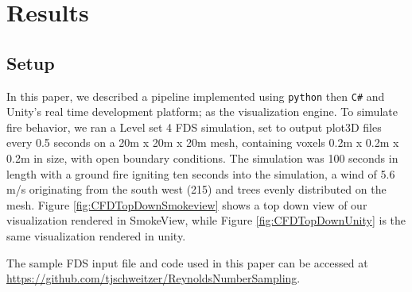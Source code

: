 
\chapter{Results} %

\label{Chapter3} %

\section{Setup}

In this paper, we described a pipeline implemented using \texttt{python} then \texttt{C\#} and Unity’s real time development platform; as the visualization engine. To simulate fire behavior, we ran a Level set 4 FDS simulation, set to output plot3D files every 0.5 seconds on a 20m x 20m x 20m mesh, containing voxels 0.2m x 0.2m x 0.2m in size, with open boundary conditions. The simulation was 100 seconds in length with a ground fire igniting ten seconds into the simulation, a wind of 5.6 m/s originating from the south west (215\textdegree) and trees evenly distributed on the mesh. Figure \ref{fig:CFDTopDownSmokeview} shows a top down view of our visualization rendered in SmokeView, while Figure \ref{fig:CFDTopDownUnity} is the same visualization rendered in unity. \par 

The sample FDS input file and code used in this paper can be accessed at  \url{https://github.com/tjschweitzer/ReynoldsNumberSampling}.

